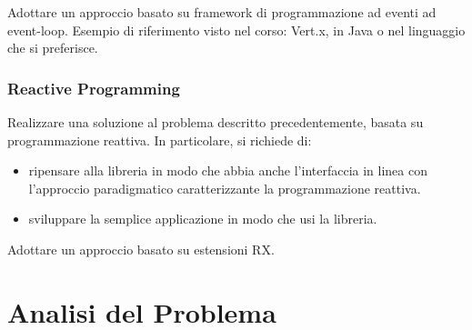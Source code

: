 \documentclass[12pt,a4paper,openright,twoside]{book}
\begin{document}
Adottare un approccio basato su framework di programmazione ad eventi ad event-loop. Esempio di riferimento visto nel corso: Vert.x, in Java o nel linguaggio che si preferisce.

\subsection{Reactive Programming}
Realizzare una soluzione al problema descritto precedentemente, basata su programmazione reattiva.
In particolare, si richiede di:
\begin{itemize}
    \item ripensare alla libreria in modo che abbia anche l'interfaccia in linea con l'approccio paradigmatico caratterizzante la programmazione reattiva.
    \item  sviluppare la semplice applicazione in modo che usi la libreria.
\end{itemize}
Adottare un approccio basato su estensioni RX.
\chapter{Analisi del Problema}
\label{chap:Analisi del Problema}
\end{document}

